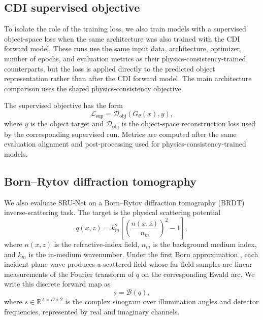 \documentclass[11pt]{article}
\begin{document}
\subsection{CDI supervised objective}

To isolate the role of the training loss, we also train models with a
supervised object-space loss when the same architecture was also trained with the
CDI forward model. These runs use the same input data, architecture, optimizer,
number of epochs, and evaluation metrics as their physics-consistency-trained
counterparts, but the loss is applied directly to the predicted object
representation rather than after the CDI forward model. The main architecture
comparison uses the shared physics-consistency objective.

The supervised objective has the form
\begin{equation}
  \mathcal{L}_{\mathrm{sup}}
  =
  \mathcal{D}_{\mathrm{obj}}\left(G_{\theta}(x), y\right),
\end{equation}
where $y$ is the object target and
$\mathcal{D}_{\mathrm{obj}}$ is the object-space reconstruction loss used by
the corresponding supervised run. Metrics are computed after the same
evaluation alignment and post-processing used for physics-consistency-trained
models.

\subsection{Born--Rytov diffraction tomography}
\label{sec:methods_brdt}

We also evaluate SRU-Net on a Born--Rytov diffraction tomography (BRDT)
inverse-scattering task. The target is the physical scattering potential
\begin{equation}
  q(x,z) = k_m^2\left[\left(\frac{n(x,z)}{n_m}\right)^2 - 1\right],
\end{equation}
where $n(x,z)$ is the refractive-index field, $n_m$ is the background medium
index, and $k_m$ is the in-medium wavenumber. Under the first Born
approximation \cite{devaney}, each incident plane wave produces a scattered
field whose far-field samples are linear measurements of the Fourier transform
of $q$ on the corresponding Ewald arc. We write this discrete forward map as
\begin{equation}
  s = \mathcal{B}(q),
\end{equation}
where $s \in \mathbb{R}^{A \times D \times 2}$ is the complex sinogram over
illumination angles and detector frequencies, represented by real and imaginary
channels.
\end{document}
